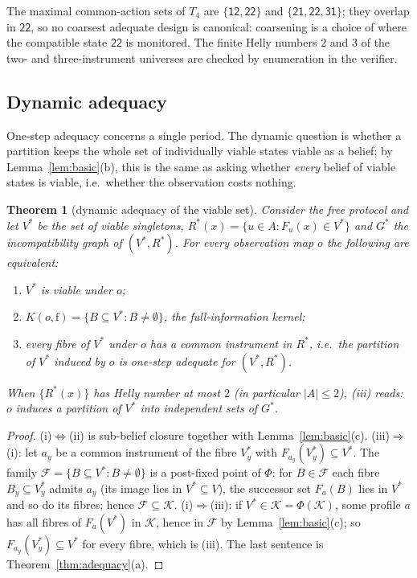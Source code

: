 \documentclass[11pt,a4paper]{article}
\theoremstyle{plain}
\newtheorem{theorem}{Theorem}[section]
\theoremstyle{definition}
\theoremstyle{remark}
\newcommand{\calF}{\mathcal{F}}
\newcommand{\calK}{\mathcal{K}}
\newcommand{\Vstar}{V^{\ast}}
\newcommand{\Rstar}{R^{\ast}}
\newcommand{\Gstar}{G^{\ast}}
\newcommand{\st}[1]{\mathsf{#1}}
\newcommand{\free}{\mathrm{f}}
\begin{document}
The maximal common-action sets of $T_4$ are $\{\st{12},\st{22}\}$ and $\{\st{21},\st{22},\st{31}\}$; they overlap in $\st{22}$, so no coarsest adequate design is canonical: coarsening is a choice of where the compatible state $\st{22}$ is monitored. The finite Helly numbers $2$ and $3$ of the two- and three-instrument universes are checked by enumeration in the verifier.

\subsection{Dynamic adequacy}

One-step adequacy concerns a single period. The dynamic question is whether a partition keeps the whole set of individually viable states viable as a belief; by Lemma~\ref{lem:basic}(b), this is the same as asking whether \emph{every} belief of viable states is viable, i.e.\ whether the observation costs nothing.

\begin{theorem}[dynamic adequacy of the viable set]\label{thm:dynamic}
Consider the free protocol and let $\Vstar$ be the set of viable singletons, $\Rstar(x)=\{u\in A:F_u(x)\in\Vstar\}$ and $\Gstar$ the incompatibility graph of $(\Vstar,\Rstar)$. For every observation map $o$ the following are equivalent:
\begin{enumerate}[label=(\roman*),leftmargin=2em,itemsep=1pt]
\item $\Vstar$ is viable under $o$;
\item $K(o,\free)=\{B\subseteq\Vstar:B\neq\emptyset\}$, the full-information kernel;
\item every fibre of $\Vstar$ under $o$ has a common instrument in $\Rstar$, i.e.\ the partition of $\Vstar$ induced by $o$ is one-step adequate for $(\Vstar,\Rstar)$.
\end{enumerate}
When $\{\Rstar(x)\}$ has Helly number at most $2$ (in particular $|A|\le 2$), (iii) reads: $o$ induces a partition of $\Vstar$ into independent sets of $\Gstar$.
\end{theorem}

\begin{proof}
(i)$\Leftrightarrow$(ii) is sub-belief closure together with Lemma~\ref{lem:basic}(c). (iii)$\Rightarrow$(i): let $a_y$ be a common instrument of the fibre $\Vstar_y$ with $F_{a_y}(\Vstar_y)\subseteq\Vstar$. The family $\calF=\{B\subseteq\Vstar: B\neq\emptyset\}$ is a post-fixed point of $\Phi$: for $B\in\calF$ each fibre $B_y\subseteq\Vstar_y$ admits $a_y$ (its image lies in $\Vstar\subseteq V$), the successor set $F_a(B)$ lies in $\Vstar$ and so do its fibres; hence $\calF\subseteq\calK$. (i)$\Rightarrow$(iii): if $\Vstar\in\calK=\Phi(\calK)$, some profile $a$ has all fibres of $F_a(\Vstar)$ in $\calK$, hence in $\calF$ by Lemma~\ref{lem:basic}(c); so $F_{a_y}(\Vstar_y)\subseteq\Vstar$ for every fibre, which is (iii). The last sentence is Theorem~\ref{thm:adequacy}(a).
\end{proof}
\end{document}
